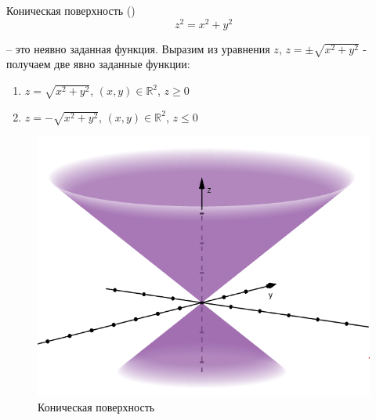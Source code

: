 \begin{minipage}{\linewidth}
	\begin{minipage}{0.6\linewidth}
		\begin{tbox*}{Коническая поверхность ()}
			\[\boxed{z^2 = x^2 + y^2}\]

			-- это неявно заданная функция. Выразим из уравнения $z$, $z = \pm \sqrt{x^2 + y^2}$ - получаем две явно заданные функции:
			\begin{enumerate}
				\item $\boxed{z = \sqrt{x^2 + y^2}}$, $(x, y) \in \mathbb{R}^2$, $z \geqslant 0$
				\item $\boxed{z = -\sqrt{x^2 + y^2}}$, $(x, y) \in \mathbb{R}^2$, $z \leqslant 0$
			\end{enumerate}
		\end{tbox*}
	\end{minipage}
	\begin{minipage}{0.35\linewidth}
		\begin{figure}[H]
			\centering
			\includegraphics[width=0.9\linewidth]{image/screenshot005.png}
			\caption{Коническая поверхность}
			\label{fig:1.2.1.2}
		\end{figure}
	\end{minipage}
\end{minipage}
